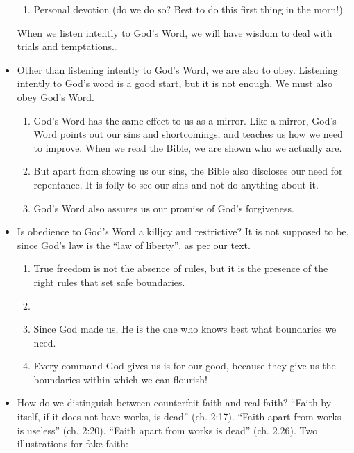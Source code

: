 \begin{itemize}
{\begin{enumerate}
    \item Personal devotion (do we do so? Best to do this first thing in the morn!)
  \end{enumerate}
  When we listen intently to God’s Word, we will have wisdom to deal with trials and temptations…
  }
  \item{Other than listening intently to God’s Word, we are also to obey. Listening intently to God’s word is a good start, but it is not enough. We must also obey God’s Word.
  \begin{enumerate}
    \item God’s Word has the same effect to us as a mirror. Like a mirror, God’s Word points out our sins and shortcomings, and teaches us how we need to improve. When we read the Bible, we are shown who we actually are.
    \item But apart from showing us our sins, the Bible also discloses our need for repentance. It is folly to see our sins and not do anything about it.
    \item God’s Word also assures us our promise of God’s forgiveness.
  \end{enumerate}
  }
  \item{Is obedience to God’s Word a killjoy and restrictive? It is not supposed to be, since God’s law is the “law of liberty”, as per our text. 
  \begin{enumerate}
    \item True freedom is not the absence of rules, but it is the presence of the right rules that set safe boundaries.
    \item {}
    \item Since God made us, He is the one who knows best what boundaries we need.
    \item Every command God gives us is for our good, because they give us the boundaries within which we can flourish!  
  \end{enumerate}}
  \item{How do we distinguish between counterfeit faith and real faith? “Faith by itself, if it does not have works, is dead” (ch. 2:17). “Faith apart from works is useless” (ch. 2:20). ``Faith apart from works is dead'' (ch. 2.26). Two illustrations for fake faith:
  \begin{enumerate}

\end{enumerate}}
\end{itemize}
